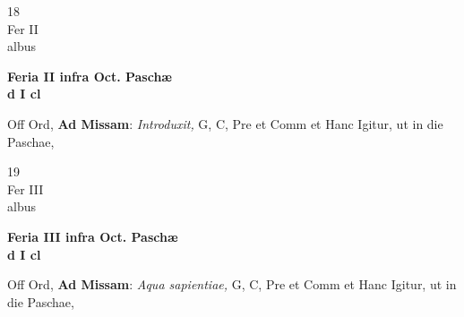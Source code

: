 \documentclass[10pt, openany]{book}
\begin{document}
        \begin{center}
            \begin{minipage}{3.5in}
                \vspace{2em}
                \begin{minipage}{0.5in}
                    {\Huge 18} \\
                    {\normalsize Fer II} \\
                    {\normalsize albus}
                \end{minipage}
                \begin{minipage}{3.0in}
                    \textbf{ \large Feria II infra Oct. Paschæ \\
                    \textnormal{\normalsize d I cl}} \\ 
                \end{minipage}
                \begin{justify}Off Ord, \textbf{Ad Missam}: \textit{Introduxit,} G, C, Pre et Comm et Hanc Igitur, ut in die Paschae,   
                \end{justify}
            \end{minipage}
        \end{center}
    
        \begin{center}
            \begin{minipage}{3.5in}
                \vspace{2em}
                \begin{minipage}{0.5in}
                    {\Huge 19} \\
                    {\normalsize Fer III} \\
                    {\normalsize albus}
                \end{minipage}
                \begin{minipage}{3.0in}
                    \textbf{ \large Feria III infra Oct. Paschæ \\
                    \textnormal{\normalsize d I cl}} \\ 
                \end{minipage}
                \begin{justify}Off Ord, \textbf{Ad Missam}: \textit{Aqua sapientiae,} G, C, Pre et Comm et Hanc Igitur, ut in die Paschae,   
                \end{justify}
            \end{minipage}
        \end{center}
    
\end{document}
